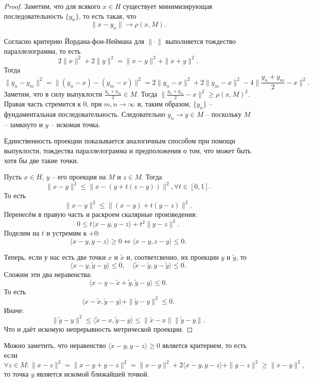 \begin{proof}
    Заметим, что для всякого $x \in H$ существует минимизирующая последовательность $\{y_n\}$, то есть такая, что
    \[
        \|x - y_n\| \rightarrow \rho(x, M).
    \]

    Согласно критерию Йордана-фон-Неймана для $\|\cdot\|$ выполняется тождество параллелограмма, то есть
    \[
        2\|x\|^2 + 2\|y\|^2 = \|x - y\|^2 + \|x + y\|^2.
    \]
    Тогда
    \[
        \|y_n - y_m\|^2 = \|(y_n - x) - (y_m - x)\|^2 = 2\|y_n - x\|^2 + 2\|y_m - x\|^2 - 4\|\frac{y_n + y_m}{2} - x\|^2.
    \]
    Заметим, что в силу выпуклости $\frac{y_n + y_m}{2} \in M$.
    Тогда $\|\frac{y_n + y_m}{2} - x\|^2 \geq \rho(x, M)^2$.
    Правая часть стремится к 0, при $m,n \rightarrow \infty$ и, таким образом, $\{y_n\}$ -- фундаментальная последовательность.
    Следовательно $y_n \rightarrow y \in M$ -- поскольку $M$ -- замкнуто и $y$ -- искомая точка.

    Единственность проекции показывается аналогичным способом при помощи выпуклости, тождества параллелограмма и предположения о том, что может быть хотя бы две такие точки.

    Пусть $x \in H$, $y$ -- его проекция на $M$ и $z \in M$.
    Тогда
    \[
        \|x - y\|^2 \leq \|x - (y + t(z - y))\|^2, \forall t \in [0, 1].
    \]
    То есть
    \[
        \|x - y\|^2 \leq \|(x - y) + t(y - z)\|^2.
    \]
    Перенесём в правую часть и раскроем скалярные произведения:
    \[
        0 \leq t\langle x - y, y - z \rangle + t^2 \|y - z\|^2.
    \]
    Поделим на $t$ и устремим к $+0\colon$
    \[
        \langle x - y, y - z \rangle \geq 0 \Longleftrightarrow \langle x - y, z - y \rangle \leq 0.
    \]

    Теперь, если у нас есть две точки $x$ и $\tilde{x}$ и, соответсвенно, их проекции $y$ и $\tilde{y}$, то
    \[
        \langle x - y, \tilde{y} - y \rangle \leq 0, \quad \langle \tilde{x} - \tilde{y}, y - \tilde{y} \rangle \leq 0.
    \]
    Сложим эти два неравенства:
    \[
        \langle x - y - \tilde{x} + \tilde{y}, \tilde{y} - y \rangle \leq 0.
    \]
    То есть
    \[
        \langle x - \tilde{x}, \tilde{y} - y \rangle + \|\tilde{y} - y\|^2 \leq 0.
    \]
    Иначе:
    \[
        \|\tilde{y} - y\|^2 \leq \langle \tilde{x} - x, \tilde{y} - y \rangle \leq \|\tilde{x} - x\|\|\tilde{y} - y\|.
    \]
    Что и даёт искомую непрерывность метрической проекции.
\end{proof}
\begin{note}
    Можно заметить, что неравенство $\langle x - y, y - z \rangle \geq 0$ является критерием, то есть если
    \[
        \forall z \in M\colon \|x - z\|^2 = \|x - y + y - z\|^2 = \|x - y \|^2 + 2 \langle x - y, y - z \rangle + \|y - z\|^2 \geq \|x - y\|^2,
    \]
    то точка $y$ является искомой ближайшей точкой.
\end{note}
